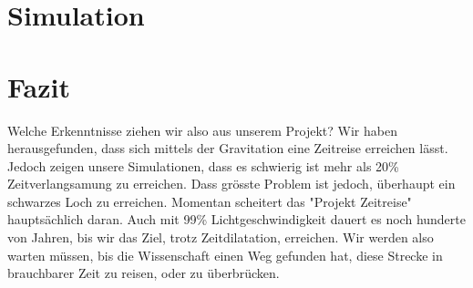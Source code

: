 \begin{refsection}
	\section{Simulation}
	
	
	\section{Fazit}
	
	Welche Erkenntnisse ziehen wir also aus unserem Projekt?
	Wir haben herausgefunden, dass sich mittels der Gravitation eine Zeitreise erreichen lässt. Jedoch zeigen unsere Simulationen, dass es schwierig ist mehr als 20\% Zeitverlangsamung zu erreichen. Dass grösste Problem ist jedoch, überhaupt ein schwarzes Loch zu erreichen. Momentan scheitert das "Projekt Zeitreise" hauptsächlich daran. Auch mit 99\% Lichtgeschwindigkeit dauert es noch hunderte von Jahren, bis wir das Ziel, trotz Zeitdilatation, erreichen. Wir werden also warten müssen, bis die Wissenschaft einen Weg gefunden hat, diese Strecke in brauchbarer Zeit zu reisen, oder zu überbrücken. %
	


	\printbibliography[heading=subbibliography]
	\end{refsection}

